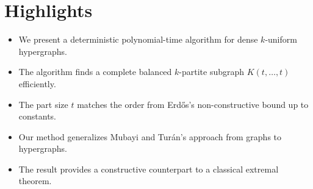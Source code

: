 \documentclass{article}
\begin{document}
\section*{Highlights}

\begin{itemize}
    \item We present a deterministic polynomial-time algorithm for dense $k$-uniform hypergraphs.
    \item The algorithm finds a complete balanced $k$-partite subgraph $K(t, \dots, t)$ efficiently.
    \item The part size $t$ matches the order from Erdős's non-constructive bound up to constants.
    \item Our method generalizes Mubayi and Turán’s approach from graphs to hypergraphs.
    \item The result provides a constructive counterpart to a classical extremal theorem.
\end{itemize}
\end{document}
